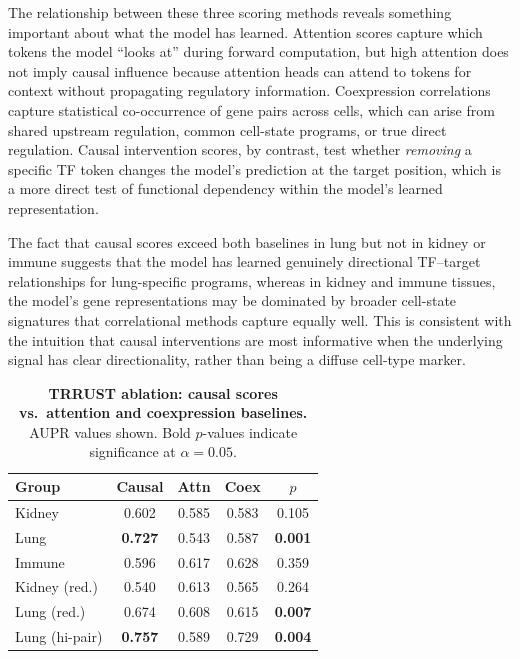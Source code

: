 \documentclass[10pt,letterpaper]{article}
\begin{document}
The relationship between these three scoring methods reveals something
important about what the model has learned. Attention scores capture which
tokens the model ``looks at'' during forward computation, but high attention
does not imply causal influence because attention heads can attend to tokens
for context without propagating regulatory information. Coexpression
correlations capture statistical co-occurrence of gene pairs across cells,
which can arise from shared upstream regulation, common cell-state programs,
or true direct regulation. Causal intervention scores, by contrast, test
whether \textit{removing} a specific TF token changes the model's prediction
at the target position, which is a more direct test of functional dependency
within the model's learned representation.

The fact that causal scores exceed both baselines in lung but not in kidney or
immune suggests that the model has learned genuinely directional TF--target
relationships for lung-specific programs, whereas in kidney and immune tissues,
the model's gene representations may be dominated by broader cell-state
signatures that correlational methods capture equally well. This is consistent
with the intuition that causal interventions are most informative when the
underlying signal has clear directionality, rather than being a diffuse
cell-type marker.

\begin{table}[!ht]
\centering
\caption{{\bf TRRUST ablation: causal scores vs.\ attention and coexpression baselines.}
AUPR values shown. Bold $p$-values indicate significance at $\alpha{=}0.05$.}
\label{tab:baseline}
\begin{tabular}{lcccc}
\toprule
\textbf{Group} & \textbf{Causal} & \textbf{Attn} & \textbf{Coex} & \textbf{$p$} \\
\midrule
Kidney & 0.602 & 0.585 & 0.583 & 0.105 \\
Lung & \textbf{0.727} & 0.543 & 0.587 & \textbf{0.001} \\
Immune & 0.596 & 0.617 & 0.628 & 0.359 \\
Kidney (red.) & 0.540 & 0.613 & 0.565 & 0.264 \\
Lung (red.) & 0.674 & 0.608 & 0.615 & \textbf{0.007} \\
Lung (hi-pair) & \textbf{0.757} & 0.589 & 0.729 & \textbf{0.004} \\
\bottomrule
\end{tabular}
\end{table}
\end{document}
